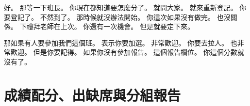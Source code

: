\hypertarget{c01:cue:1709}{}好。
\hypertarget{c01:cue:1710}{}那等一下班長。
\hypertarget{c01:cue:1711}{}你現在都知道要怎麼分了。
\hypertarget{c01:cue:1712}{}就問大家。
\hypertarget{c01:cue:1713}{}就來重新登記。
\hypertarget{c01:cue:1714}{}你要登記了。
\hypertarget{c01:cue:1715}{}不然到了。
\hypertarget{c01:cue:1716}{}那時候就沒辦法開始。
\hypertarget{c01:cue:1717}{}你這次如果沒有做完。
\hypertarget{c01:cue:1718}{}也沒關係。
\hypertarget{c01:cue:1719}{}下禮拜老師在上次。
\hypertarget{c01:cue:1720}{}你還有一次機會。
\hypertarget{c01:cue:1721}{}但是就要定下來。

\hypertarget{c01:cue:1722}{}那如果有人要參加我們這個班。
\hypertarget{c01:cue:1723}{}表示你要加選。
\hypertarget{c01:cue:1724}{}非常歡迎。
\hypertarget{c01:cue:1725}{}你要去拉人。
\hypertarget{c01:cue:1726}{}也非常歡迎。
\hypertarget{c01:cue:1727}{}但是你要記得。
\hypertarget{c01:cue:1728}{}如果你沒有參加報告。
\hypertarget{c01:cue:1729}{}這個報告欄位。
\hypertarget{c01:cue:1730}{}你這個分數就沒有了。

\section{成績配分、出缺席與分組報告}

